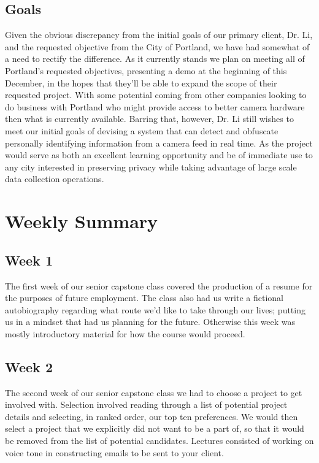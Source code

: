 \documentclass[onecolumn, draftclsnofoot,10pt, compsoc]{IEEEtran}
\begin{document}
\subsection{Goals}
Given the obvious discrepancy from the initial goals of our primary client, Dr. Li, and the requested objective from the City of Portland, we have had somewhat of a need to rectify the difference. As it currently stands we plan on meeting all of Portland’s requested objectives, presenting a demo at the beginning of this December, in the hopes that they’ll be able to expand the scope of their requested project. With some potential coming from other companies looking to do business with Portland who might provide access to better camera hardware then what is currently available. Barring that, however, Dr. Li still wishes to meet our initial goals of devising a system that can detect and obfuscate personally identifying information from a camera feed in real time. As the project would serve as both an excellent learning opportunity and be of immediate use to any city interested in preserving privacy while taking advantage of large scale data collection operations.

\section{Weekly Summary}
\subsection{Week 1}
The first week of our senior capstone class covered the production of a resume for the purposes of future employment. The class also had us write a fictional autobiography regarding what route we’d like to take through our lives; putting us in a mindset that had us planning for the future. Otherwise this week was mostly introductory material for how the course would proceed.

\subsection{Week 2}
The second week of our senior capstone class we had to choose a project to get involved with. Selection involved reading through a list of potential project details and selecting, in ranked order, our top ten preferences. We would then select a project that we explicitly did not want to be a part of, so that it would be removed from the list of potential candidates. Lectures consisted of working on voice tone in constructing emails to be sent to your client.
\end{document}

